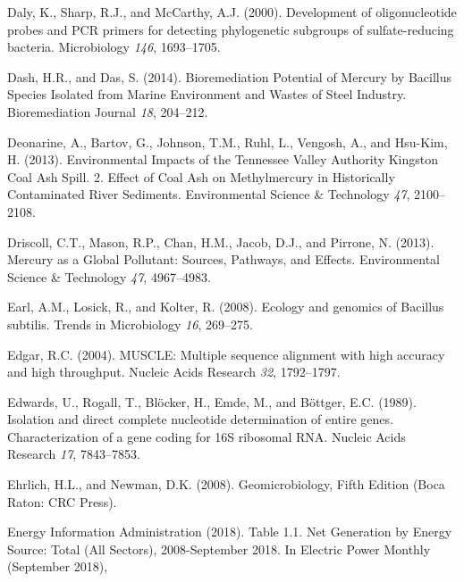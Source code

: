 \documentclass[ms, hidelinks]{uncgdissertationexp}
\theoremstyle{plain}
\theoremstyle{definition}
\theoremstyle{remark}
\begin{document}
\leavevmode\hypertarget{ref-dalyDevelopmentOligonucleotideProbes2000}{}%
Daly, K., Sharp, R.J., and McCarthy, A.J. (2000). Development of oligonucleotide probes and PCR primers for detecting phylogenetic subgroups of sulfate-reducing bacteria. Microbiology \emph{146}, 1693--1705.

\leavevmode\hypertarget{ref-dashBioremediationPotentialMercury2014}{}%
Dash, H.R., and Das, S. (2014). Bioremediation Potential of Mercury by Bacillus Species Isolated from Marine Environment and Wastes of Steel Industry. Bioremediation Journal \emph{18}, 204--212.

\leavevmode\hypertarget{ref-deonarineEnvironmentalImpactsTennessee2013}{}%
Deonarine, A., Bartov, G., Johnson, T.M., Ruhl, L., Vengosh, A., and Hsu-Kim, H. (2013). Environmental Impacts of the Tennessee Valley Authority Kingston Coal Ash Spill. 2. Effect of Coal Ash on Methylmercury in Historically Contaminated River Sediments. Environmental Science \& Technology \emph{47}, 2100--2108.

\leavevmode\hypertarget{ref-driscollMercuryGlobalPollutant2013}{}%
Driscoll, C.T., Mason, R.P., Chan, H.M., Jacob, D.J., and Pirrone, N. (2013). Mercury as a Global Pollutant: Sources, Pathways, and Effects. Environmental Science \& Technology \emph{47}, 4967--4983.

\leavevmode\hypertarget{ref-earlEcologyGenomicsBacillus2008}{}%
Earl, A.M., Losick, R., and Kolter, R. (2008). Ecology and genomics of Bacillus subtilis. Trends in Microbiology \emph{16}, 269--275.

\leavevmode\hypertarget{ref-edgarMUSCLEMultipleSequence2004}{}%
Edgar, R.C. (2004). MUSCLE: Multiple sequence alignment with high accuracy and high throughput. Nucleic Acids Research \emph{32}, 1792--1797.

\leavevmode\hypertarget{ref-edwardsIsolationDirectComplete1989}{}%
Edwards, U., Rogall, T., Blöcker, H., Emde, M., and Böttger, E.C. (1989). Isolation and direct complete nucleotide determination of entire genes. Characterization of a gene coding for 16S ribosomal RNA. Nucleic Acids Research \emph{17}, 7843--7853.

\leavevmode\hypertarget{ref-ehrlichGeomicrobiologyFifthEdition2008}{}%
Ehrlich, H.L., and Newman, D.K. (2008). Geomicrobiology, Fifth Edition (Boca Raton: CRC Press).

\leavevmode\hypertarget{ref-energyinformationadministrationTableNetGeneration2018}{}%
Energy Information Administration (2018). Table 1.1. Net Generation by Energy Source: Total (All Sectors), 2008-September 2018. In Electric Power Monthly (September 2018),
\end{document}
